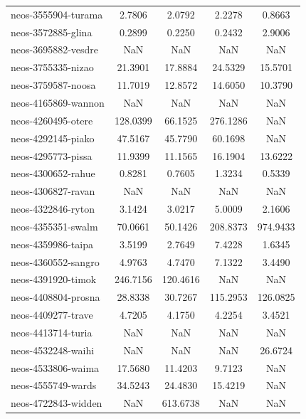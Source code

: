\begin{longtable}{lcccc}
neos-3555904-turama         &    2.7806 &   2.0792 &    2.2278 &    0.8663 \\
neos-3572885-glina          &    0.2899 &   0.2250 &    0.2432 &    2.9006 \\
neos-3695882-vesdre         &       NaN &      NaN &       NaN &       NaN \\
neos-3755335-nizao          &   21.3901 &  17.8884 &   24.5329 &   15.5701 \\
neos-3759587-noosa          &   11.7019 &  12.8572 &   14.6050 &   10.3790 \\
neos-4165869-wannon         &       NaN &      NaN &       NaN &       NaN \\
neos-4260495-otere          &  128.0399 &  66.1525 &  276.1286 &       NaN \\
neos-4292145-piako          &   47.5167 &  45.7790 &   60.1698 &       NaN \\
neos-4295773-pissa          &   11.9399 &  11.1565 &   16.1904 &   13.6222 \\
neos-4300652-rahue          &    0.8281 &   0.7605 &    1.3234 &    0.5339 \\
neos-4306827-ravan          &       NaN &      NaN &       NaN &       NaN \\
neos-4322846-ryton          &    3.1424 &   3.0217 &    5.0009 &    2.1606 \\
neos-4355351-swalm          &   70.0661 &  50.1426 &  208.8373 &  974.9433 \\
neos-4359986-taipa          &    3.5199 &   2.7649 &    7.4228 &    1.6345 \\
neos-4360552-sangro         &    4.9763 &   4.7470 &    7.1322 &    3.4490 \\
neos-4391920-timok          &  246.7156 & 120.4616 &       NaN &       NaN \\
neos-4408804-prosna         &   28.8338 &  30.7267 &  115.2953 &  126.0825 \\
neos-4409277-trave          &    4.7205 &   4.1750 &    4.2254 &    3.4521 \\
neos-4413714-turia          &       NaN &      NaN &       NaN &       NaN \\
neos-4532248-waihi          &       NaN &      NaN &       NaN &   26.6724 \\
neos-4533806-waima          &   17.5680 &  11.4203 &    9.7123 &       NaN \\
neos-4555749-wards          &   34.5243 &  24.4830 &   15.4219 &       NaN \\
neos-4722843-widden         &       NaN & 613.6738 &       NaN &       NaN \\

\end{longtable}
